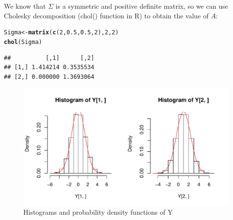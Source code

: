\documentclass[12pt, a4paper]{article}\usepackage[]{graphicx}\usepackage[]{color}
\makeatletter
\def\maxwidth{ %
  \ifdim\Gin@nat@width>\linewidth
    \linewidth
  \else
    \Gin@nat@width
  \fi
}
\newcommand{\hlnum}[1]{\textcolor[rgb]{0.686,0.059,0.569}{#1}}%
\newcommand{\hlstd}[1]{\textcolor[rgb]{0.345,0.345,0.345}{#1}}%
\newcommand{\hlkwb}[1]{\textcolor[rgb]{0.69,0.353,0.396}{#1}}%
\newcommand{\hlkwd}[1]{\textcolor[rgb]{0.737,0.353,0.396}{\textbf{#1}}}%
\newenvironment{kframe}{%
 \def\at@end@of@kframe{}%
 \ifinner\ifhmode%
  \def\at@end@of@kframe{\end{minipage}}%
  \begin{minipage}{\columnwidth}%
 \fi\fi%
 \def\FrameCommand##1{\hskip\@totalleftmargin \hskip-\fboxsep
 \colorbox{shadecolor}{##1}\hskip-\fboxsep
     \hskip-\linewidth \hskip-\@totalleftmargin \hskip\columnwidth}%
 \MakeFramed {\advance\hsize-\width
   \@totalleftmargin\z@ \linewidth\hsize
   \@setminipage}}%
 {\par\unskip\endMakeFramed%
 \at@end@of@kframe}
\newenvironment{knitrout}{}{} %
\makeatother
\begin{document}
We know that $\Sigma$ is a symmetric and positive definite matrix, so we can use Cholesky decomposition (chol() function in R) to obtain the value of $A$:
\begin{knitrout}
\color{fgcolor}\begin{kframe}
\begin{alltt}
\hlstd{Sigma} \hlkwb{<-} \hlkwd{matrix}\hlstd{(}\hlkwd{c}\hlstd{(}\hlnum{2}\hlstd{,} \hlnum{0.5}\hlstd{,} \hlnum{0.5}\hlstd{,} \hlnum{2}\hlstd{),} \hlnum{2}\hlstd{,} \hlnum{2}\hlstd{)}
\hlkwd{chol}\hlstd{(Sigma)}
\end{alltt}
\begin{verbatim}
##          [,1]      [,2]
## [1,] 1.414214 0.3535534
## [2,] 0.000000 1.3693064
\end{verbatim}
\end{kframe}
\end{knitrout}




\begin{knitrout}
\color{fgcolor}\begin{figure}[H]

{\centering \includegraphics[width=\maxwidth]{figure/ex2checkDistrY2-1} 

}

\caption[Histograms and probability density functions of Y]{Histograms and probability density functions of Y}\label{fig:ex2checkDistrY2}
\end{figure}


\end{knitrout}
\end{document}
